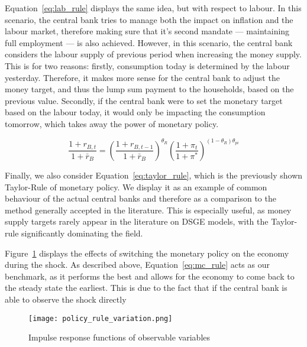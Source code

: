 \documentclass[12pt]{article}
\begin{document}
Equation~\ref{eq:lab_rule} displays the same idea, but with respect to labour. In this scenario, the central bank tries to manage both the impact on inflation and the labour market, therefore making sure that it's second mandate --- maintaining full employment --- is also achieved. However, in this scenario, the central bank considers the labour supply of previous period when increasing the money supply. This is for two reasons: firstly, consumption today is determined by the labour yesterday. Therefore, it makes more sense for the central bank to adjust the money target, and thus the lump sum payment to the households, based on the previous value. Secondly, if the central bank were to set the monetary target based on the labour today, it would only be impacting the consumption tomorrow, which takes away the power of monetary policy.  

\begin{equation}\label{eq:taylor_rule}
    \frac{1 + r_{B,t}}{1 + \bar{r}_B} = \left( \frac{1 + r_{B,t-1}}{1 + \bar{r}_B} \right)^{\theta_R} \left( \frac{1 + \pi_t}{1 + \pi^*} \right)^{(1 - \theta_R)\theta_{pi}}
\end{equation}

Finally, we also consider Equation~\ref{eq:taylor_rule}, which is the previously shown Taylor-Rule of monetary policy. We display it as an example of common behaviour of the actual central banks and therefore as a comparison to the method generally accepted in the literature. This is especially useful, as money supply targets rarely appear in the literature on DSGE models, with the Taylor-rule significantly dominating the field.  


Figure~\ref{fig:policy_rule_variation} displays the effects of switching the monetary policy on the economy during the shock. As described above, Equation~\ref{eq:mc_rule} acts as our benchmark, as it performs the best and allows for the economy to come back to the steady state the earliest. This is due to the fact that if the central bank is able to observe the shock directly 
\begin{figure}[!h]
    \caption{Impulse response functions of observable variables}\label{fig:policy_rule_variation}
    \centering
    \texttt{[image: policy\_rule\_variation.png]}
\end{figure}





\newpage
\end{document}
